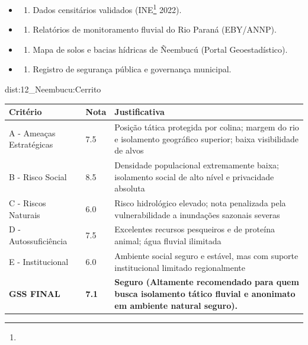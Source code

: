 {\begin{itemize}
\tightlist
\item
  \begin{enumerate}
  \def\labelenumi{\arabic{enumi})}
  \tightlist
  \item
    Dados censitários validados (INE\footnote{\fineINE} 2022).
  \end{enumerate}
\item
  \begin{enumerate}
  \def\labelenumi{\arabic{enumi})}
  \setcounter{enumi}{1}
  \tightlist
  \item
    Relatórios de monitoramento fluvial do Rio Paraná (EBY/\allowbreak ANNP).
  \end{enumerate}
\item
  \begin{enumerate}
  \def\labelenumi{\arabic{enumi})}
  \setcounter{enumi}{2}
  \tightlist
  \item
    Mapa de solos e bacias hídricas de Ñeembucú (Portal Geoestadístico).
  \end{enumerate}
\item
  \begin{enumerate}
  \def\labelenumi{\arabic{enumi})}
  \setcounter{enumi}{3}
  \tightlist
  \item
    Registro de segurança pública e governança municipal.
  \end{enumerate}
\end{itemize}}{dist:12_Neembucu:Cerrito}
\begin{table}[ht!]
\small \begin{tabular}{p{3.0cm}p{0.8cm}p{6.0cm}} \toprule
\textbf{Critério} & \textbf{Nota} & \textbf{Justificativa} \\ \midrule
A - Ameaças Estratégicas & 7.5 & Posição tática protegida por colina; margem do rio e isolamento geográfico superior; baixa visibilidade de alvos \\
B - Risco Social & 8.5 & Densidade populacional extremamente baixa; isolamento social de alto nível e privacidade absoluta \\
C - Riscos Naturais & 6.0 & Risco hidrológico elevado; nota penalizada pela vulnerabilidade a inundações sazonais severas \\
D - Autossuficiência & 7.5 & Excelentes recursos pesqueiros e de proteína animal; água fluvial ilimitada \\
E - Institucional & 6.0 & Ambiente social seguro e estável, mas com suporte institucional limitado regionalmente \\
\midrule \textbf{GSS FINAL} & \textbf{7.1} & \textbf{Seguro (Altamente recomendado para quem busca isolamento tático fluvial e anonimato em ambiente natural seguro).} \\ \bottomrule \end{tabular}
\end{table}

